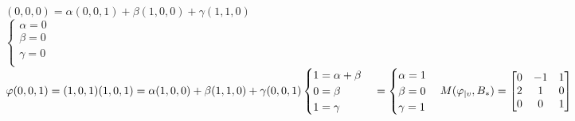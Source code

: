\documentclass[a4paper, twoside,11pt]{report}
\begin{document}
\begin{enumerate}
\begin{enumerate}
\begin{enumerate}
            \\$(0,0,0)=\alpha(0,0,1)+\beta(1,0,0)+\gamma(1,1,0)$
            \\$\begin{cases}
                \alpha=0\\
                \beta=0\\
                \gamma=0\\
            \end{cases}$
            \\$\varphi(0,0,1)=(1,0,1)
            \\(1,0,1)=\alpha(1,0,0)+\beta(1,1,0)+\gamma(0,0,1)
            \\\begin{cases}
                1=\alpha+\beta\\
                0=\beta\\
                1=\gamma\\
                \end{cases} = \begin{cases}
                                \alpha=1\\
                                \beta=0\\
                                \gamma=1\\
                                \end{cases}
            \\M(\varphi_{|v},B_*)=\begin{bmatrix}
            0 & -1 & 1\\
            2 & 1 & 0\\
            0 & 0 & 1\\
            \end{bmatrix}
            $
        \end{enumerate}
    \end{enumerate}

\end{enumerate}
\end{document}
